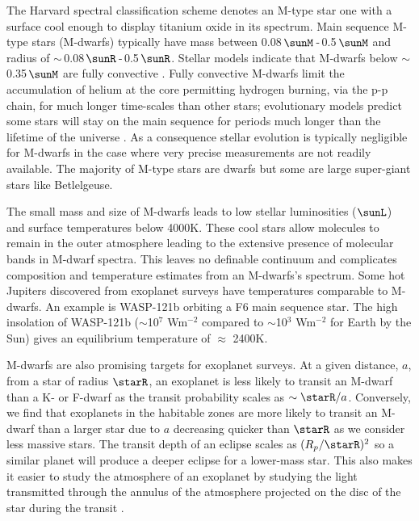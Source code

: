 The Harvard spectral classification scheme denotes an M-type star one with a surface cool enough to display titanium oxide in its  spectrum. Main sequence M-type stars (M-dwarfs) typically have mass between 0.08\,$\sunM$\,-\,0.5\,$\sunM$ and radius of $\sim$\,0.08\,$\sunR$\,-\,0.5\,$\sunR$. Stellar models indicate that M-dwarfs below $\sim$ 0.35\,$\sunM$ are fully convective \cite{Reiners2009}. Fully convective M-dwarfs limit the accumulation of helium at the core permitting hydrogen burning, via the p-p chain, for much longer time-scales than other stars; evolutionary models predict some stars will stay on the main sequence for periods much longer than the lifetime of the universe \cite{Baraffe1998}. As a consequence stellar evolution is typically negligible for M-dwarfs in the case where very precise measurements are not readily available. The majority of M-type stars are dwarfs but some are large super-giant stars like Betlelgeuse.
  
The small mass and size of M-dwarfs leads to low stellar luminosities ($\sunL$) and surface temperatures below 4000K. These cool stars allow molecules to remain in the outer atmosphere leading to the extensive presence of molecular bands in M-dwarf spectra. This leaves no definable continuum and complicates composition and temperature estimates from an M-dwarfs's spectrum. Some hot Jupiters discovered from exoplanet surveys have temperatures comparable to M-dwarfs. An example is WASP-121b \cite{Delrez2016} orbiting a F6 main sequence star. The high insolation of WASP-121b ($\sim$10$^{7}$ Wm$^{-2}$ compared to $\sim$10$^{3}$ Wm$^{-2}$ for Earth by the Sun) gives an equilibrium temperature of $\approx$ 2400K.


M-dwarfs are also promising targets for exoplanet surveys. At a given distance, $a$, from a star of radius $\starR$, an exoplanet is less likely to transit an M-dwarf than a K- or F-dwarf as the transit probability scales as $\sim \starR/a$. Conversely, we find that exoplanets in the habitable zones are more likely to transit an M-dwarf than a larger star due to $a$ decreasing quicker than $\starR$ as we consider less massive  stars. The transit depth of an eclipse scales as $(R_{p}/\starR)^2$ so a similar planet will produce a deeper eclipse for a lower-mass star. This also makes it easier to study the atmosphere of an exoplanet by studying the light transmitted through the annulus of the atmosphere projected on the disc of the star during the transit \cite{Berta2012}.

